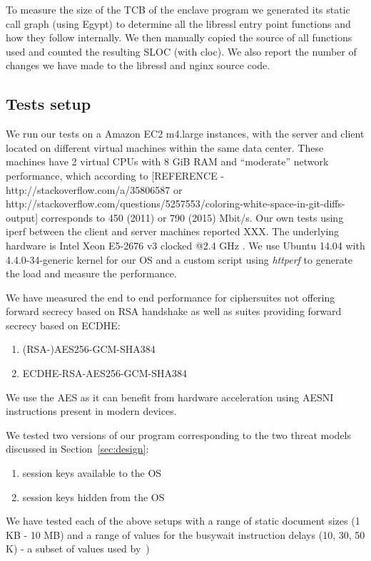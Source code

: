 \documentclass[../main.tex]{subfiles}
\begin{document}
To measure the size of the TCB of the enclave program we generated its static
call graph (using Egypt) to determine all the libressl entry point functions
and how they follow internally. We then manually copied the source of all
functions used and counted the resulting SLOC (with cloc). We also report the
number of changes we have made to the libressl and nginx source code.

\subsection{Tests setup}
We run our tests on a Amazon EC2 m4.large instances, with the server and
client located on different virtual machines within the same data center.
These machines have 2 virtual CPUs with 8 GiB RAM and ``moderate'' network
performance, which according to [REFERENCE - http://stackoverflow.com/a/35806587  or  http://stackoverflow.com/questions/5257553/coloring-white-space-in-git-diffs-output] corresponds to 450 (2011) or 790 (2015) Mbit/s. Our
own tests using iperf between the client and server machines reported XXX. The
underlying hardware is Intel Xeon E5-2676 v3 clocked @2.4 GHz
\cite{aws_instances}. We use Ubuntu 14.04 with 4.4.0-34-generic kernel for our
OS and a custom script using \textit{httperf} to generate the load and measure
the performance.

We have measured the end to end performance for ciphersuites not offering
forward secrecy based on RSA handshake as well as suites providing forward
secrecy based on ECDHE:
\begin{enumerate}
  \item (RSA-)AES256-GCM-SHA384
  \item ECDHE-RSA-AES256-GCM-SHA384
\end{enumerate}

We use the AES as it can benefit from hardware acceleration using AESNI
instructions present in modern devices.

We tested two versions of our program corresponding to the two threat models
discussed in Section~\ref{sec:design}:
\begin{enumerate}
  \item session keys available to the OS
  \item session keys hidden from the OS
\end{enumerate}

We have tested each of the above setups with a range of static document sizes
(1 KB - 10 MB) and a range of values for the busywait instruction delays (10,
30, 50 K) - a subset of values used by~\cite{Baumann14})
\end{document}
